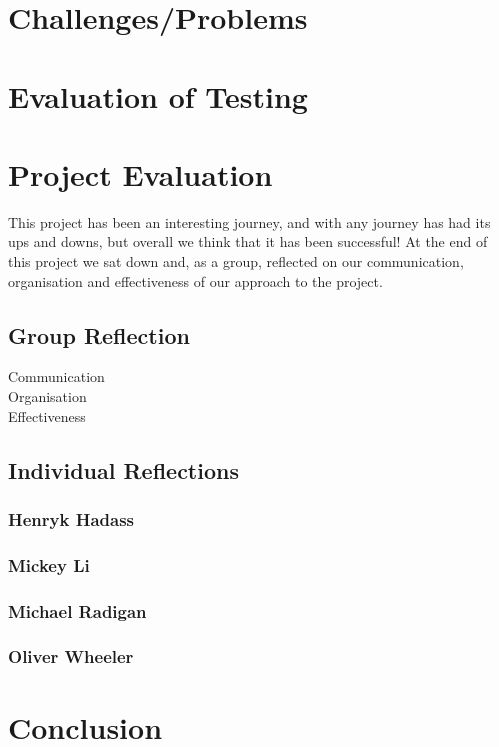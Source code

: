\documentclass[11pt]{article}
\begin{document}
\section{Challenges/Problems}



\section{Evaluation of Testing}




\section{Project Evaluation}
This project has been an interesting journey, and with any journey has had its ups and downs, but overall we think that it has been successful! At the end of this project we sat down and, as a group, reflected on our communication, organisation and effectiveness of our approach to the project.
\subsection{Group Reflection}

\begin{description}
\item[Communication]


\item[Organisation]


\item[Effectiveness]

\end{description}

\subsection{Individual Reflections}

\subsubsection*{Henryk Hadass}

\subsubsection*{Mickey Li}

\subsubsection*{Michael Radigan}

\subsubsection*{Oliver Wheeler}

\section{Conclusion}
\end{document}
